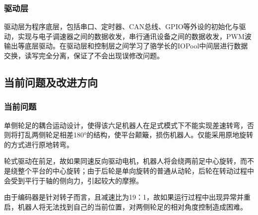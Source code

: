 \documentclass[a4paper, 11pt]{article}   %
\begin{document}
\begin{CJK}{UTF8}{gbsn}
\begin{spacing}{1.15}
\subsubsection{驱动层}
驱动层为程序底层，包括串口、定时器、CAN总线、GPIO等外设的初始化与驱动，实现与电子调速器之间的数据收发，串行通讯设备之间的数据收发，PWM波输出等底层驱动。在驱动层和控制层之间学习了骆学长的IOPool中间层进行数据交换，读写完全分离，保证了不会出现误修改问题。
\subsection{当前问题及改进方向}
\subsubsection{当前问题}
单侧轮足的耦合运动设计，使得该六足机器人在足式模式下不能实现差速转弯，否则将打乱两侧轮足相差180°的结构，使平台颠簸，损伤机器人。仅能采用原地旋转的方式进行原地转弯。\par
轮式驱动在前足，故如果同速反向驱动电机，机器人将会绕两前足中心旋转，而不是绕整个平台的中心旋转；由于后轮是单向旋转的普通从动轮，后轮在转动过程中会受到平行于轴的侧向力，引起较大的摩擦。\par
由于编码器是针对转子而言，且减速比为19：1，故如果运行过程中出现异常并重启，机器人将无法找到自己的当前位置，对两侧轮足的相对角度控制造成困难。

\end{spacing}
\end{CJK}
\end{document}
